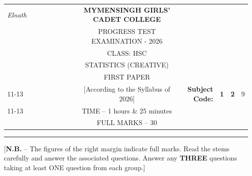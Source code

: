 \documentclass[12pt]{article}
\begin{document}
\begin{table}[]
\begin{tabular}{llllllllcllcl}
\textit{Elnath} &  &  &  &  &  &  &  & \textbf{MYMENSINGH GIRLS’ CADET COLLEGE} &                                             &                                 & \multicolumn{1}{l}{}            &                        \\
                 &  &  &  &  &  &  &  & PROGRESS TEST EXAMINATION - 2026          &                                             &                                 &                                 &                        \\
                 &  &  &  &  &  &  &  & CLASS: HSC                               &                                             &                                 &                                 &                        \\
                 &  &  &  &  &  &  &  & STATISTICS (CREATIVE)                    &                                             &                                 &                                 &                        \\
                 &  &  &  &  &  &  &  & FIRST PAPER                             &                                             &                                 & \multicolumn{1}{r}{}            &                        \\ \cline{11-13} 
                 &  &  &  &  &  &  &  & [According to the Syllabus of 2026]      & \multicolumn{1}{r|}{\textbf{Subject Code:}} & \multicolumn{1}{l|}{\textbf{1}} & \multicolumn{1}{l|}{\textbf{2}} & \multicolumn{1}{l|}{9} \\ \cline{11-13} 
                 &  &  &  &  &  &  &  & TIME – 1 hours \& 25 minutes             &                                             &                                 & \multicolumn{1}{r}{}            &                        \\
                 &  &  &  &  &  &  &  & FULL MARKS – 30                          &                                             &                                 & \multicolumn{1}{r}{\textbf{}}   &                       
\end{tabular}
\end{table}


\hrule

\begin{center}
[\textbf{N.B.} – The figures of the right margin indicate full marks. Read the stems carefully and answer the associated questions. Answer any \textbf{THREE} questions taking at least ONE question from each group.]\\
\end{center}
\end{document}

